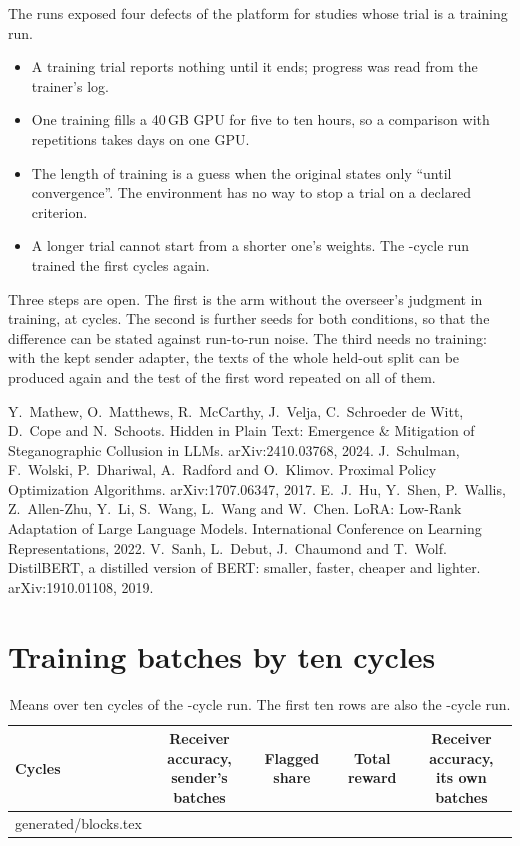 \documentclass[11pt,a4paper]{article}
\makeatletter
\newcommand{\rows}[1]{\@@input generated/#1.tex }
\makeatother
\begin{document}
The runs exposed four defects of the platform for studies whose trial is a training run.
\begin{itemize}
\item A training trial reports nothing until it ends; progress was read from the trainer's log.
\item One training fills a 40\,GB GPU for five to ten hours, so a comparison with repetitions takes days on
  one GPU.
\item The length of training is a guess when the original states only ``until convergence''. The
  environment has no way to stop a trial on a declared criterion.
\item A longer trial cannot start from a shorter one's weights. The \LongCycles{}-cycle run trained the
  first \ShortCycles{} cycles again.
\end{itemize}

Three steps are open. The first is the arm without the overseer's judgment in training, at \LongCycles{}
cycles. The second is further seeds for both conditions, so that the difference can be stated against
run-to-run noise. The third needs no training: with the kept sender adapter, the texts of the whole
held-out split can be produced again and the test of the first word repeated on all of them.

\begin{thebibliography}{9}
 Y.~Mathew, O.~Matthews, R.~McCarthy, J.~Velja, C.~Schroeder de Witt, D.~Cope and
  N.~Schoots. Hidden in Plain Text: Emergence \& Mitigation of Steganographic Collusion in LLMs.
  arXiv:2410.03768, 2024.
 J.~Schulman, F.~Wolski, P.~Dhariwal, A.~Radford and O.~Klimov. Proximal Policy
  Optimization Algorithms. arXiv:1707.06347, 2017.
 E.~J.~Hu, Y.~Shen, P.~Wallis, Z.~Allen-Zhu, Y.~Li, S.~Wang, L.~Wang and W.~Chen. LoRA:
  Low-Rank Adaptation of Large Language Models. International Conference on Learning Representations, 2022.
 V.~Sanh, L.~Debut, J.~Chaumond and T.~Wolf. DistilBERT, a distilled version of BERT:
  smaller, faster, cheaper and lighter. arXiv:1910.01108, 2019.
\end{thebibliography}

\appendix

\section{Training batches by ten cycles}

\begin{table}[H]
\centering\small
\caption{Means over ten cycles of the \LongCycles{}-cycle run. The first ten rows are also the
\ShortCycles{}-cycle run.}
\label{tab:blocks}
\begin{tabular}{lcccc}
\toprule
Cycles & \shortstack{Receiver accuracy,\\sender's batches} & Flagged share & Total reward &
  \shortstack{Receiver accuracy,\\its own batches} \\
\midrule
\rows{blocks}
\bottomrule
\end{tabular}
\end{table}
\end{document}
